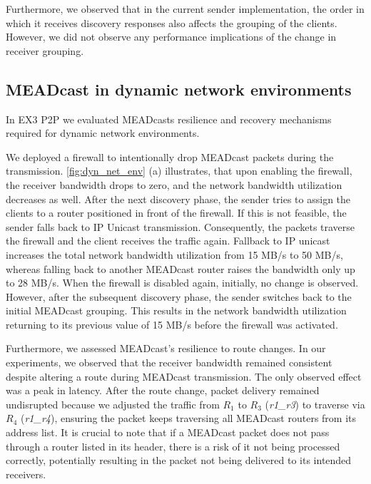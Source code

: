 Furthermore, we observed that in the current sender implementation, the order
    in which it receives discovery responses also affects the grouping of the
    clients.
However, we did not observe any performance implications of the change in
    receiver grouping.

\subsection{MEADcast in dynamic network environments} %
\label{sub:Results_MEADcast in dynamic network environments}

In EX3 P2P we evaluated MEADcasts resilience and recovery mechanisms required
    for dynamic network environments.

We deployed a firewall to intentionally drop MEADcast packets during the
    transmission.
\autoref{fig:dyn_net_env} (a) illustrates, that upon enabling the firewall,
    the receiver bandwidth drops to zero, and the network bandwidth utilization
    decreases as well.
After the next discovery phase, the sender tries to assign the clients to a
    router positioned in front of the firewall.
If this is not feasible, the sender falls back to IP Unicast transmission.
Consequently, the packets traverse the firewall and the client receives the 
    traffic again.
Fallback to IP unicast increases the total network bandwidth utilization from
    15 MB/s to 50 MB/s, whereas falling back to another MEADcast router raises
    the bandwidth only up to 28 MB/s.
When the firewall is disabled again, initially, no change is observed.
However, after the subsequent discovery phase, the sender switches back to the
    initial MEADcast grouping.
This results in the network bandwidth utilization returning to its previous
    value of 15 MB/s before the firewall was activated.

Furthermore, we assessed MEADcast's resilience to route changes.
In our experiments, we observed that the receiver bandwidth remained consistent
    despite altering a route during MEADcast transmission.
The only observed effect was a peak in latency.
After the route change, packet delivery remained undisrupted because we
    adjusted the traffic from $R_1$ to $R_3$ (\textit{r1\_r3}) to traverse via
    $R_4$ (\textit{r1\_r4}), ensuring the packet keeps traversing all MEADcast
    routers from its address list.
It is crucial to note that if a MEADcast packet does not pass through a router
    listed in its header, there is a risk of it not being processed correctly,
    potentially resulting in the packet not being delivered to its intended
    receivers. 


